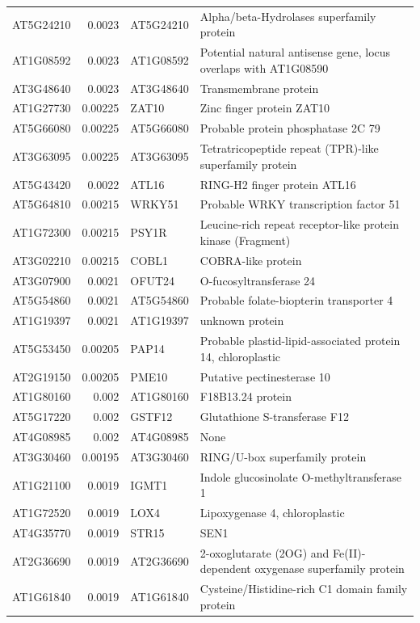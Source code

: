 \documentclass[11pt]{article}
\begin{document}
\begin{center}
\begin{tabular}{lrll}
AT5G24210 & 0.0023 & AT5G24210 & Alpha/beta-Hydrolases superfamily protein\\
AT1G08592 & 0.0023 & AT1G08592 & Potential natural antisense gene, locus overlaps with AT1G08590\\
AT3G48640 & 0.0023 & AT3G48640 & Transmembrane protein\\
AT1G27730 & 0.00225 & ZAT10 & Zinc finger protein ZAT10\\
AT5G66080 & 0.00225 & AT5G66080 & Probable protein phosphatase 2C 79\\
AT3G63095 & 0.00225 & AT3G63095 & Tetratricopeptide repeat (TPR)-like superfamily protein\\
AT5G43420 & 0.0022 & ATL16 & RING-H2 finger protein ATL16\\
AT5G64810 & 0.00215 & WRKY51 & Probable WRKY transcription factor 51\\
AT1G72300 & 0.00215 & PSY1R & Leucine-rich repeat receptor-like protein kinase (Fragment)\\
AT3G02210 & 0.00215 & COBL1 & COBRA-like protein\\
AT3G07900 & 0.0021 & OFUT24 & O-fucosyltransferase 24\\
AT5G54860 & 0.0021 & AT5G54860 & Probable folate-biopterin transporter 4\\
AT1G19397 & 0.0021 & AT1G19397 & unknown protein\\
AT5G53450 & 0.00205 & PAP14 & Probable plastid-lipid-associated protein 14, chloroplastic\\
AT2G19150 & 0.00205 & PME10 & Putative pectinesterase 10\\
AT1G80160 & 0.002 & AT1G80160 & F18B13.24 protein\\
AT5G17220 & 0.002 & GSTF12 & Glutathione S-transferase F12\\
AT4G08985 & 0.002 & AT4G08985 & None\\
AT3G30460 & 0.00195 & AT3G30460 & RING/U-box superfamily protein\\
AT1G21100 & 0.0019 & IGMT1 & Indole glucosinolate O-methyltransferase 1\\
AT1G72520 & 0.0019 & LOX4 & Lipoxygenase 4, chloroplastic\\
AT4G35770 & 0.0019 & STR15 & SEN1\\
AT2G36690 & 0.0019 & AT2G36690 & 2-oxoglutarate (2OG) and Fe(II)-dependent oxygenase superfamily protein\\
AT1G61840 & 0.0019 & AT1G61840 & Cysteine/Histidine-rich C1 domain family protein\\

\end{tabular}
\end{center}
\end{document}
